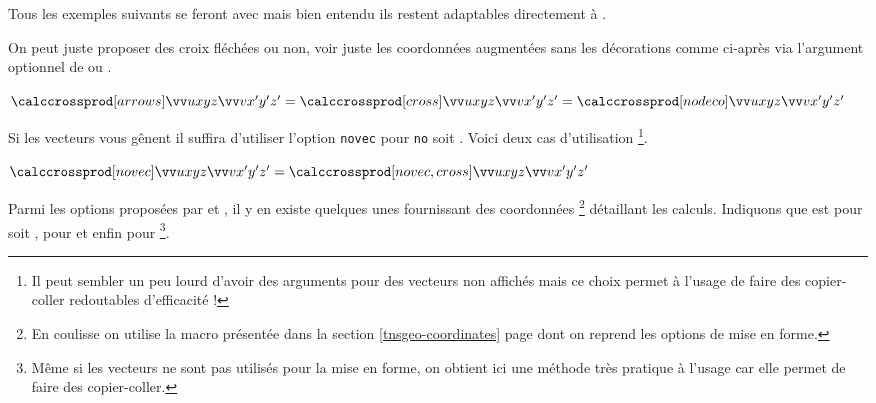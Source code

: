 \documentclass[12pt,a4paper]{article}
\begin{document}
\begin{remark}
    Tous les exemples suivants se feront avec  mais bien entendu ils restent adaptables directement à .
\end{remark}





On peut juste proposer des croix fléchées ou non, voir juste les coordonnées \og augmentées \fg{} sans les décorations comme ci-après via l'argument optionnel de  ou .

\begin{latexex}
$ \vcalccrossprod[arrows]{u}{x}{y}{z}%
                         {v}{x'}{y'}{z'}
= \vcalccrossprod[cross] {u}{x}{y}{z}%
                         {v}{x'}{y'}{z'}
= \vcalccrossprod[nodeco]{u}{x}{y}{z}%
                         {v}{x'}{y'}{z'}$
\end{latexex}





Si les vecteurs vous gênent il suffira d'utiliser l'option \verb+novec+ pour \verb+no+  soit .
Voici deux cas d'utilisation
\footnote{
	Il peut sembler un peu lourd d'avoir des arguments pour des vecteurs non affichés mais ce choix permet à l'usage de faire des copier-coller redoutables d'efficacité !
}.


\begin{latexex}
$ \vcalccrossprod[novec]
      {u}{x}{y}{z}{v}{x'}{y'}{z'}
= \vcalccrossprod[novec,cross]
      {u}{x}{y}{z}{v}{x'}{y'}{z'}$
\end{latexex}






Parmi les options proposées par  et , il y en existe quelques unes fournissant des coordonnées
\footnote{
	En coulisse on utilise la macro  présentée dans la section \ref{tnsgeo-coordinates} page \pageref{tnsgeo-coordinates} dont on reprend les options de mise en forme. 
}
détaillant les calculs. Indiquons que  est pour  soit ,  pour  et enfin  pour 
\footnote{
	Même si les vecteurs ne sont pas utilisés pour la mise en forme, on obtient ici une méthode très pratique à l'usage car elle permet de faire des copier-coller.
}.
\end{document}
